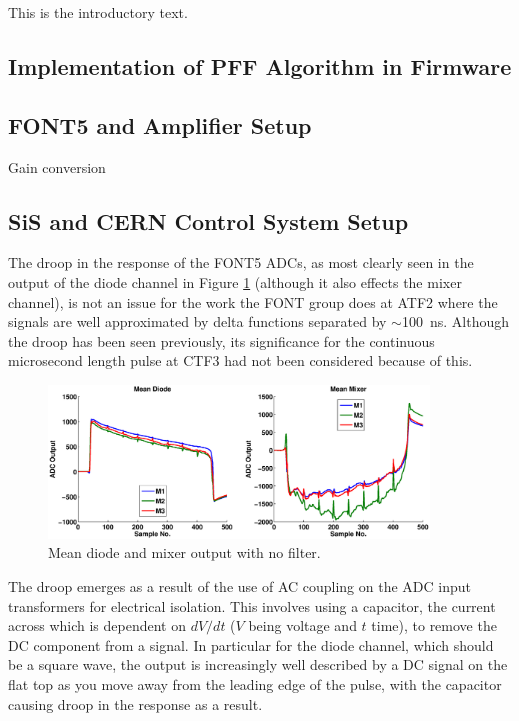 
This is the introductory text.


\subsection{Implementation of PFF Algorithm in Firmware}
\label{ss:pffFirmware}

\subsection{FONT5 and Amplifier Setup}
\label{ss:fontSetup}

Gain conversion

\subsection{SiS and CERN Control System Setup}
\label{ss:sisSetup}


The droop in the response of the FONT5 ADCs, as most clearly seen in the output of the diode channel in Figure \ref{f:diodeDroop} (although it also effects the mixer channel), is not an issue for the work the FONT group does at ATF2 where the signals are well approximated by delta functions separated by \(\sim\)100~ns. Although the droop has been seen previously, its significance for the continuous microsecond length pulse at CTF3 had not been considered because of this.

\begin{figure}
  \centering
  \includegraphics[width=0.9\textwidth]{Figures/diodeDroop}
  \caption{Mean diode and mixer output with no filter.}
  \label{f:diodeDroop}
\end{figure}

The droop emerges as a result of the use of AC coupling on the ADC input transformers for electrical isolation. This involves using a capacitor, the current across which is dependent on \({dV}/{dt}\) (\(V\) being voltage and \(t\) time), to remove the DC component from a signal. In particular for the diode channel, which should be a square wave, the output is increasingly well described by a DC signal on the flat top as you move away from the leading edge of the pulse, with the capacitor causing droop in the response as a result.

